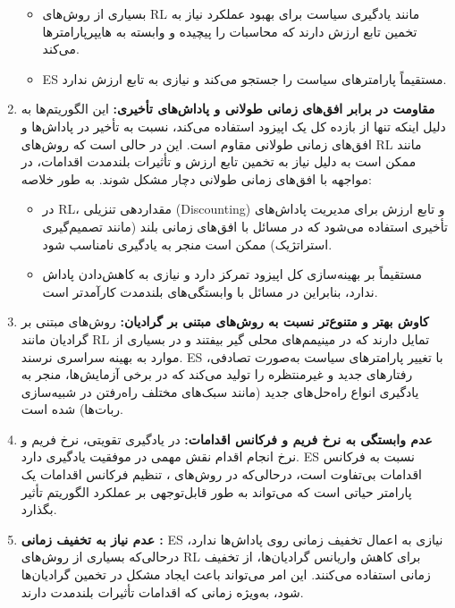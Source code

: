 \documentclass[12pt]{exam}
\begin{document}
\begin{questions}
\begin{enumerate}
\begin{itemize}
				\item
				بسیاری از روش‌های RL مانند یادگیری سیاست 
				برای بهبود عملکرد نیاز به تخمین تابع ارزش دارند که محاسبات را پیچیده و وابسته به هایپرپارامترها می‌کند.
				\item ES  مستقیماً پارامترهای سیاست را جستجو می‌کند و نیازی به تابع ارزش ندارد.
			\end{itemize}
			\item \textbf{مقاومت در برابر افق‌های زمانی طولانی و پاداش‌های تأخیری:}
			این الگوریتم‌ها به دلیل اینکه تنها از بازده کل یک اپیزود استفاده می‌کند، نسبت به تأخیر در پاداش‌ها و افق‌های زمانی طولانی مقاوم است. این در حالی است که روش‌های RL مانند
			ممکن است به دلیل نیاز به تخمین تابع ارزش و تأثیرات بلندمدت اقدامات، در مواجهه با افق‌های زمانی طولانی دچار مشکل شوند. به طور خلاصه:
			\begin{itemize}
				\item 
				در RL، مقداردهی تنزیلی (Discounting) و تابع ارزش برای مدیریت پاداش‌های تأخیری استفاده می‌شود که در مسائل با افق‌های زمانی بلند (مانند تصمیم‌گیری استراتژیک) ممکن است منجر به یادگیری نامناسب شود.
				\item  {} 
				مستقیماً بر بهینه‌سازی کل اپیزود تمرکز دارد و نیازی به کاهش‌دادن پاداش ندارد، بنابراین در مسائل با وابستگی‌های بلندمدت کارآمدتر است.
				\end{itemize}
				\item \textbf{کاوش بهتر و متنوع‌تر نسبت به روش‌های مبتنی بر گرادیان: }
				روش‌های مبتنی بر گرادیان مانند RL تمایل دارند که در مینیمم‌های محلی گیر بیفتند و در بسیاری از موارد به بهینه سراسری نرسند. ES با تغییر پارامترهای سیاست به‌صورت تصادفی، رفتارهای جدید و غیرمنتظره را تولید می‌کند که در برخی آزمایش‌ها، منجر به یادگیری انواع راه‌حل‌های جدید (مانند سبک‌های مختلف راه‌رفتن در شبیه‌سازی ربات‌ها) شده است.
				\item \textbf{عدم وابستگی به نرخ فریم 
				و فرکانس اقدامات:}
				در یادگیری تقویتی، نرخ فریم و نرخ انجام اقدام نقش مهمی در موفقیت یادگیری دارد. ES  نسبت به فرکانس اقدامات 
				بی‌تفاوت است، درحالی‌که در روش‌های
				، تنظیم فرکانس اقدامات 
				یک پارامتر حیاتی است که می‌تواند به طور قابل‌توجهی بر عملکرد الگوریتم تأثیر بگذارد.
				\item\textbf{ عدم نیاز به تخفیف زمانی :}
				ES نیازی به اعمال تخفیف زمانی روی پاداش‌ها ندارد، درحالی‌که بسیاری از روش‌های RL برای کاهش واریانس گرادیان‌ها، از تخفیف زمانی استفاده می‌کنند. این امر می‌تواند باعث ایجاد مشکل در تخمین گرادیان‌ها شود، به‌ویژه زمانی که اقدامات تأثیرات بلندمدت دارند.

\end{enumerate}
\end{questions}
\end{document}
